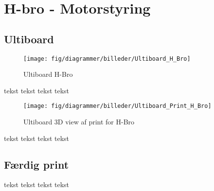 
\section{H-bro - Motorstyring}





\subsection{Ultiboard}


\begin{figure}[h]
	\centering
	\texttt{[image: fig/diagrammer/billeder/Ultiboard\_H\_Bro]}
	\label{fig:Ultiboard_H_Bro}
	\caption{Ultiboard H-Bro}
\end{figure}
tekst tekst tekst tekst
\begin{figure}[h]
	\centering
	\texttt{[image: fig/diagrammer/billeder/Ultiboard\_Print\_H\_Bro]}
	\label{fig:Ultiboard_Print_H_Bro}
	\caption{Ultiboard 3D view af print for H-Bro}
\end{figure}

tekst tekst tekst tekst
\subsection{Færdig print}
tekst tekst tekst tekst


